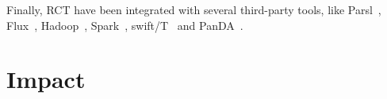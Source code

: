 \documentclass[preprint,12pt, a4paper]{elsarticle}
\begin{document}
Finally, RCT have been integrated with several third-party tools, like
Parsl~\cite{alsaadi2022radical}, Flux~\cite{rp-flux-url},
Hadoop~\cite{luckow2016hadoop}, Spark~\cite{paraskevakos2018task},
swift/T~\cite{turilli2016integrating} and PanDA~\cite{merzky2019panda}.




\section{Impact}\label{sec:impact}

\end{document}
